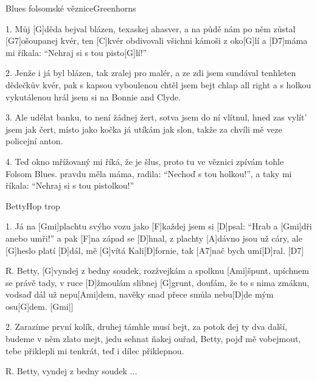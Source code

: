 \begin{song}{Blues folsomské věznice}{Greenhorns}

\begin{xverse}{1. }
Můj [G]děda bejval blázen, texaskej ahasver,
a na půdě nám po něm zůstal [G7]ošoupanej kvér,
ten [C]kvér obdivovali všichni kámoši z oko[G]lí
a [D7]máma mi říkala: ``Nehraj si s tou pisto[G]lí!''
\end{xverse}

\begin{xverse}{2. }
Jenže i já byl blázen, tak zralej pro malér,
a ze  zdi jsem sundával tenhleten dědečkův kvér,
pak s kapsou vyboulenou chtěl jsem bejt chlap all right
a s holkou vykutálenou hrál jsem si na Bonnie and Clyde.
\end{xverse}

\begin{xverse}{3. }
Ale udělat banku, to není žádnej žert,
sotva jsem do ní vlítnul, hned zas vylít' jsem jak čert,
místo jako kočka já utíkám jak slon,
takže za chvíli mě veze policejní anton.
\end{xverse}

\begin{xverse}{4. }
Teď okno mřížovaný mi říká, že je šlus,
proto tu ve věznici zpívám tohle Folsom Blues.
pravdu měla máma, radila: ``Nechoď s tou holkou!'',
a taky mi říkala: ``Nehraj si s tou pistolkou!''
\end{xverse}

\end{song}

\begin{song}{Betty}{Hop trop}

\begin{xverse}{1. }
Já na [Gmi]plachtu svýho vozu jako [F]každej jsem si [D]psal:
``Hrab a [Gmi]dři anebo umři!'' a pak [F]na západ se [D]hnal,
z plachty [A]dávno jsou už cáry, ale [G]heslo platí [D]dál,
mě [G]vítá Kali[D]fornie, tak [A7]nač bych umí[D]ral. [D7]{}
\end{xverse}

\begin{xverse}{R. }
Betty, [G]vyndej z bedny soudek, rozžvejkám a spolknu [Ami]{}špunt,
upíchnem se právě tady, v ruce [D]{}žmoulám slibnej [G]grunt,
doufám, že to s nima zmáknu, vodsaď dál už nepu[Ami]dem,
navěky snad přece smůla nebu[D]de mým osu[G]dem. [Gmi|]{}
\end{xverse}

\begin{xverse}{2. }
Zarazíme první kolík, druhej támhle musí bejt,
za potok dej ty dva další, budeme v něm zlato mejt,
jedu sehnat ňakej ouřad, Betty, pojď mě vobejmout,
tebe přiklepli mi tenkrát, teď i dílec přiklepnou.
\end{xverse}

\begin{xverse}{R. }
Betty, vyndej z bedny soudek ...
\end{xverse}

\end{song}

